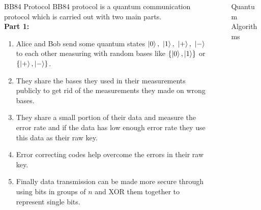 \documentclass[final, 20pt]{beamer}
\newlength{\sepwid}
\newlength{\onecolwid}
\newlength{\twocolwid}
\begin{document}
\begin{frame}[t]
\begin{columns}[t]
\begin{column}{\twocolwid}
\begin{columns}[t,totalwidth=\twocolwid]
\begin{column}{\onecolwid}
\begin{block}{BB84 Protocol}
BB84 protocol is a quantum communication protocol which is  carried out with two main parts.\\
\textbf{Part 1:}
\begin{enumerate}
\item Alice and Bob send some quantum states $\ket{0}, \ \ket{1}, \ \ket{+}, \ \ket{-}$ to each other measuring with random bases like $\left\lbrace \ket{0},\ket{1}\right\rbrace$ or $\left\lbrace \ket{+},\ket{-}\right\rbrace$. 
\item They share the bases they used in their measurements publicly to get rid of the measurements they made on wrong bases. 
\item They share a small portion of their data and measure the error rate and if the data has low enough error rate they use this data as their raw key.
\item Error correcting codes help overcome the errors in their raw key. 
\item Finally data transmission can be made more secure through using bits in groups of $n$ and XOR them together to represent single bits.
\end{enumerate}
\end{block}

\end{column} %

\end{columns} %

\end{column} %

\begin{column}{\sepwid}\end{column} %

\begin{column}{\onecolwid} %


\begin{block}{Quantum Algorithms}


\end{block}
\end{column}
\end{columns}
\end{frame}
\end{document}
